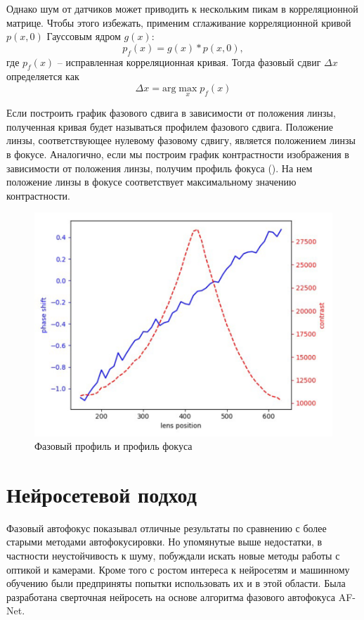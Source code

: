 Однако шум от датчиков может приводить к нескольким пикам в корреляционной матрице. Чтобы этого избежать, применим сглаживание корреляционной кривой $p(x,0 )$ Гауссовым ядром $g(x)$:
\begin{equation}
	p_f(x) = g(x) * p(x, 0),
\end{equation}
где $p_f(x)$ -- исправленная корреляционная кривая. Тогда фазовый сдвиг $\Delta x$ определяется как
\begin{equation}
	\Delta x = \text{arg} \max_x p_f(x)
\end{equation} 

Если построить график фазового сдвига в зависимости от положения линзы, полученная кривая будет называться профилем фазового сдвига. Положение линзы, соответствующее нулевому фазовому сдвигу, является положением линзы в фокусе. Аналогично, если мы построим график контрастности изображения в зависимости от положения линзы, получим профиль фокуса (). На нем положение линзы в фокусе соответствует максимальному значению контрастности.

\begin{figure}[ht!] 
	\center
	\includegraphics [scale=0.7] {my_folder/images/phase_profile.png}
	\caption{Фазовый профиль и профиль фокуса}
	\label{fig:phse_profile}
\end{figure}

\section{Нейросетевой подход} \label{ch1:sec2} 
Фазовый автофокус показывал отличные результаты по сравнению с более старыми методами автофокусировки. Но упомянутые выше недостатки, в частности неустойчивость к шуму, побуждали искать новые методы работы с оптикой и камерами. Кроме того с ростом интереса к нейросетям и машинному обучению были предприняты попытки использовать их и в этой области. Была разработана сверточная нейросеть на основе алгоритма фазового автофокуса AF-Net.

